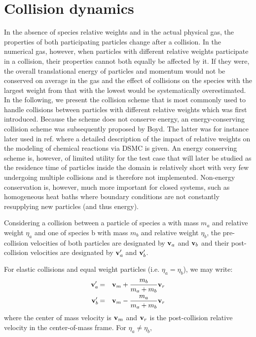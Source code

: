 \documentclass[12pt]{article}
\newcommand*{\myprime}{^{\prime}\mkern-1.2mu}
\newcommand{\bv}{{\bf v}}
\newcommand{\va}{\bv_a}
\newcommand{\vb}{\bv_b}
\newcommand{\vap}{\va\myprime}
\newcommand{\vbp}{\vb\myprime}
\begin{document}
\section{Collision dynamics}

In the absence of species relative weights and in the actual physical
gas, the properties of both participating particles change after a
collision. In the numerical gas, however, when particles with
different relative weights participate in a collision, their
properties cannot both equally be affected by it. If they were, the
overall translational energy of particles and momentum would not be
conserved on average in the gas and the effect of collisions on the
species with the largest weight from that with the lowest would be
systematically overestimated. In the following, we present the
collision scheme that is most commonly used to handle collisions
between particles with different relative weights which was first
introduced. Because the scheme does not conserve energy, an
energy-conserving collision scheme was subsequently proposed by
Boyd. The latter was for instance later used in ref. where a detailed
description of the impact of relative weights on the modeling of
chemical reactions via DSMC is given. An energy conserving scheme is,
however, of limited utility for the test case that will later be
studied as the residence time of particles inside the domain is
relatively short with very few undergoing multiple collisions and is
therefore not implemented.  Non-energy conservation is, however, much
more important for closed systems, such as homogeneous heat baths
where boundary conditions are not constantly resupplying new particles
(and thus energy).

Considering a collision between a particle of species a with mass
$m_a$ and relative weight $\eta_a$ and one of species b with mass $m_b$
and relative weight $\eta_b$, the pre-collision velocities of both
particles are designated by $\va$ and $\vb$ and their post-collision
velocities are designated by $\vap$ and $\vbp$. 

For elastic collisions and equal weight particles (i.e. $\eta_a=\eta_b$), we
may write:
\begin{eqnarray}
  \vap &=& \bv_m + \frac{m_b}{m_a+m_b}\bv_r \\
  \vbp &=& \bv_m - \frac{m_a}{m_a+m_b}\bv_r
\end{eqnarray}
where the center of mass velocity is $\bv_m$ and $\bv_r$ is the
post-collision relative velocity in the center-of-mass frame.  For
$\eta_a\not=\eta_b$, 
\end{document}
